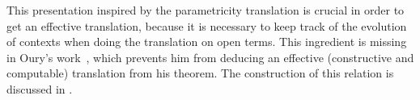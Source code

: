 This presentation inspired by the parametricity translation is crucial
in order to get an effective translation, because it is necessary to
keep track of the evolution of contexts when doing the translation on
open terms.
%
This ingredient is missing in Oury's work~,
which prevents him from deducing an effective (\ie constructive and
computable) translation from his theorem.
The construction of this relation is discussed in .